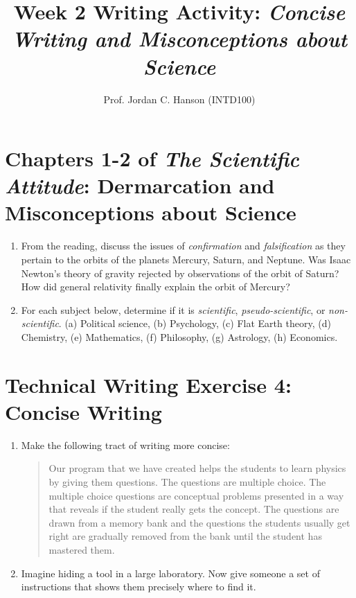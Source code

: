 \documentclass{article}
\begin{document}
\title{Week 2 Writing Activity: \textit{Concise Writing and Misconceptions about Science}}
\author{Prof. Jordan C. Hanson (INTD100)}

\maketitle

\section{Chapters 1-2 of \textit{The Scientific Attitude}: Dermarcation and Misconceptions about Science}

\begin{enumerate}
\item From the reading, discuss the issues of \textit{confirmation} and \textit{falsification} as they pertain to the orbits of the planets Mercury, Saturn, and Neptune.  Was Isaac Newton's theory of gravity rejected by observations of the orbit of Saturn?  How did general relativity finally explain the orbit of Mercury? \\ \vspace{3cm}
\item For each subject below, determine if it is \textit{scientific}, \textit{pseudo-scientific}, or \textit{non-scientific}. (a) Political science, (b) Psychology, (c) Flat Earth theory, (d) Chemistry, (e) Mathematics, (f) Philosophy, (g) Astrology, (h) Economics.\\ \vspace{1cm}
\end{enumerate}

\section{Technical Writing Exercise 4: Concise Writing}

\begin{enumerate}
\item Make the following tract of writing more concise:
\begin{quotation}
Our program that we have created helps the students to learn physics by giving them questions.  The questions are multiple choice.  The multiple choice questions are conceptual problems presented in a way that reveals if the student really gets the concept.  The questions are drawn from a memory bank and the questions the students usually get right are gradually removed from the bank until the student has mastered them.
\end{quotation} \vspace{2cm}
\item Imagine hiding a tool in a large laboratory.  Now give someone a set of instructions that shows them precisely where to find it.
\end{enumerate}
\end{document}
